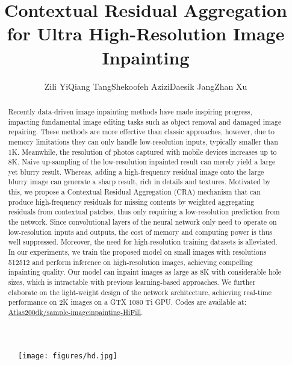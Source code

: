 \documentclass[oribibl]{llncs}  \usepackage[width=122mm,left=12mm,paperwidth=146mm,height=193mm,top=12mm,paperheight=217mm]{geometry}
\begin{document}
\title{Contextual Residual Aggregation for Ultra High-Resolution Image Inpainting}

\author{Zili Yi\qquad Qiang Tang\qquad Shekoofeh Azizi\qquad Daesik Jang\qquad Zhan Xu}





\maketitle


\begin{figure}
\begin{center}
  \texttt{[image: figures/hd.jpg]} 
\end{center}
\end{figure}


\begin{abstract}
Recently data-driven image inpainting methods have made inspiring progress, impacting fundamental image editing tasks such as object removal and damaged image repairing. These methods are more effective than classic approaches,  however, due to memory limitations they can only handle low-resolution inputs, typically smaller than 1K. Meanwhile, the resolution of photos captured with mobile devices increases up to 8K. Naive up-sampling of the low-resolution inpainted result can merely yield a large yet blurry result. Whereas, adding a high-frequency residual image onto the large blurry image can generate a sharp result, rich in details and textures. Motivated by this, we propose a Contextual Residual Aggregation (CRA) mechanism that can produce high-frequency residuals for missing contents by weighted aggregating residuals from contextual patches, thus only requiring a low-resolution prediction from the network. Since convolutional layers of the neural network only need to operate on low-resolution inputs and outputs, the cost of memory and computing power is thus well suppressed. Moreover, the need for high-resolution training datasets is alleviated. In our experiments, we train the proposed model on small images with resolutions 512512 and perform inference on high-resolution images, achieving compelling inpainting quality. Our model can inpaint images as large as 8K with considerable hole sizes, which is intractable with previous learning-based approaches. We further elaborate on the light-weight design of the network architecture, achieving real-time performance on 2K images on a GTX 1080 Ti GPU. Codes are available at: \href{https://github.com/Atlas200dk/sample-imageinpainting-HiFill}{Atlas200dk/sample-imageinpainting-HiFill}.
\end{abstract}
\end{document}
